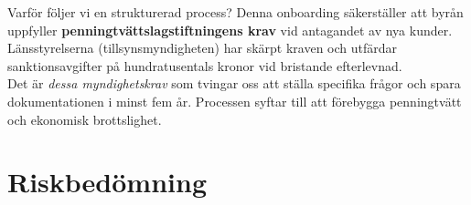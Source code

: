 \documentclass[10pt]{beamer}
\begin{document}
\begin{frame}[label=intro]
  \vspace{0.5cm}
  
  \begin{block}{Varför följer vi en strukturerad process?}
    \footnotesize
    Denna onboarding säkerställer att byrån uppfyller \textbf{penningtvättslagstiftningens krav} vid antagandet av nya kunder. Länsstyrelserna (tillsynsmyndigheten) har skärpt kraven och utfärdar sanktionsavgifter på hundratusentals kronor vid bristande efterlevnad.\\
    \vspace{0.2cm}
    Det är \textit{dessa myndighetskrav} som tvingar oss att ställa specifika frågor och spara dokumentationen i minst fem år. Processen syftar till att förebygga penningtvätt och ekonomisk brottslighet.
  \end{block}

  \vspace{0.8cm}
  \begin{flushright}
    \hyperlink{riskfragor-steg1}{}
  \end{flushright}
  
\end{frame}



\section{Riskbedömning}

\end{document}
